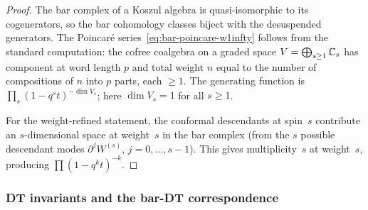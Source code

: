 \begin{proof}
The bar complex of a Koszul algebra is quasi-isomorphic to its
cogenerators, so the bar cohomology classes biject with the
desuspended generators. The Poincar\'{e}
series~\eqref{eq:bar-poincare-w1infty} follows from the standard
computation: the cofree coalgebra on a graded space $V = \bigoplus_{s
\ge 1} \mathbb C_s$ has component at word length $p$ and total weight $n$
equal to the number of compositions of $n$ into $p$ parts, each $\ge
1$. The generating function is $\prod_s (1 - q^s t)^{-\dim V_s}$; here
$\dim V_s = 1$ for all $s \ge 1$.

For the weight-refined statement, the conformal descendants at spin~$s$
contribute an $s$-dimensional space at weight~$s$ in the bar complex
(from the $s$ possible descendant modes $\partial^j W^{(s)}$,
$j = 0, \ldots, s-1$). This gives multiplicity~$s$ at weight~$s$,
producing $\prod (1 - q^k t)^{-k}$.
\end{proof}

\subsubsection{DT invariants and the bar-DT correspondence}
\label{subsubsec:dt-invariants}


